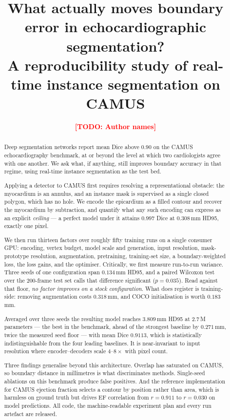 \documentclass[review,1p,times]{elsarticle}
\newcommand{\TODO}[1]{\textcolor{red}{\textbf{[TODO: #1]}}}
\begin{document}
\begin{frontmatter}

\title{What actually moves boundary error in echocardiographic segmentation?\\
A reproducibility study of real-time instance segmentation on CAMUS}

\author[a]{\TODO{Author names}}
\address[a]{\TODO{Affiliation}}

\begin{abstract}
Deep segmentation networks report mean Dice above $0.90$ on the CAMUS
echocardiography benchmark, at or beyond the level at which two cardiologists
agree with one another. We ask what, if anything, still improves boundary
accuracy in that regime, using real-time instance segmentation as the test bed.

Applying a detector to CAMUS first requires resolving a representational
obstacle: the myocardium is an annulus, and an instance mask is supervised as a
single closed polygon, which has no hole. We encode the epicardium as a filled
contour and recover the myocardium by subtraction, and quantify what any such
encoding can express as an explicit \emph{ceiling} --- a perfect model under it
attains $0.997$ Dice at $0.308$\,mm HD95, exactly one pixel.

We then run thirteen factors over roughly fifty training runs on a single
consumer GPU: encoding, vertex budget, model scale and generation, input
resolution, mask-prototype resolution, augmentation, pretraining, training-set
size, a boundary-weighted loss, the loss gains, and the optimiser. Critically,
we first measure run-to-run variance. Three seeds of one configuration span
$0.134$\,mm HD95, and a paired Wilcoxon test over the 200-frame test set calls
that difference significant ($p{=}0.035$). Read against that floor,
\emph{no factor improves on a stock configuration}. What does register is
training-side: removing augmentation costs $0.318$\,mm, and COCO initialisation
is worth $0.183$\,mm.

Averaged over three seeds the resulting model reaches $3.809$\,mm HD95 at
$2.7$\,M parameters --- the best in the benchmark, ahead of the strongest
baseline by $0.271$\,mm, twice the measured seed floor --- with mean Dice
$0.9113$, which is statistically indistinguishable from the four leading
baselines. It is near-invariant to input resolution where encoder--decoders
scale $4$--$8\times$ with pixel count.

Three findings generalise beyond this architecture. Overlap has saturated on
CAMUS, so boundary distance in millimetres is what discriminates methods.
Single-seed ablations on this benchmark produce false positives. And the
reference implementation for CAMUS ejection fraction selects a contour by
position rather than area, which is harmless on ground truth but drives EF
correlation from $r{=}0.911$ to $r{=}0.030$ on model predictions. All code, the
machine-readable experiment plan and every run artefact are released.
\end{abstract}


\end{frontmatter}
\end{document}
